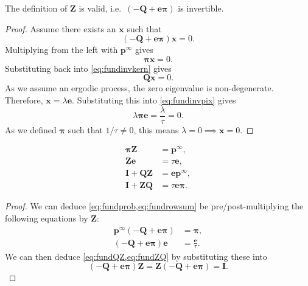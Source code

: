\documentclass[9pt,twocolumn,twoside,lineno]{pnas-new}
\newcommand{\ie}{i.e.\ }
\newcommand{\I}{\mathbf{I}}
\newcommand{\onev}{\mathbf{e}}
\newcommand{\MM}{\mathbf{Q}}
\newcommand{\prob}{\mathbf{p}}
\newcommand{\eq}{\prob^\infty}
\newcommand{\fund}{\mathbf{Z}}
\newcommand{\pib}{\boldsymbol{\pi}}
\begin{document}
\begin{strip}
\begin{thm}
  The definition of $\fund$ is valid, \ie $(-\MM + \onev\pib)$ is invertible.
\end{thm}
\begin{proof}
  Assume there exists an $\mathbf{x}$ such that
  \begin{equation}\label{eq:fundinvkern}
    (-\MM + \onev\pib)\mathbf{x}=0.
  \end{equation}
  Multiplying from the left with $\eq$ gives
  \begin{equation}\label{eq:fundinvpix}
    \pib \mathbf{x} = 0.
  \end{equation}
  Substituting back into \cref{eq:fundinvkern} gives
  \begin{equation*}
    \MM\mathbf{x}=0.
  \end{equation*}
  As we assume an ergodic process, the zero eigenvalue is non-degenerate.
  Therefore, $\mathbf{x}=\lambda\onev$.
  Substituting this into \cref{eq:fundinvpix} gives
  \begin{equation*}
    \lambda\pib\onev = \frac{\lambda}{\tau} = 0.
  \end{equation*}
  As we defined $\pib$ such that $1/\tau\neq0$, this means $\lambda=0 \implies \mathbf{x}=0$.
\end{proof}

\begin{cor}
  \begin{align}
    \pib\fund &= \eq, \label{eq:fundprob}\\
    \fund\onev &= \tau\onev,\label{eq:fundrowsum}\\
    \I+\MM\fund &= \onev\eq, \label{eq:fundQZ}\\
    \I+\fund\MM &= \tau\onev\pib. \label{eq:fundZQ}
  \end{align}
\end{cor}
\begin{proof}
  We can deduce \cref{eq:fundprob,eq:fundrowsum} be pre/post-multiplying the following equations by $\fund$:
  \begin{equation*}
    \begin{aligned}
      \eq(-\MM + \onev\pib) &= \pib, \\
      (-\MM + \onev\pib)\onev &= \frac{\onev}{\tau}.
    \end{aligned}
  \end{equation*}
  We can then deduce \cref{eq:fundQZ,eq:fundZQ} by substituting these into
  \begin{equation*}
    (-\MM + \onev\pib)\fund = \fund(-\MM + \onev\pib) = \I.
  \end{equation*}
\end{proof}


\end{strip}
\end{document}
